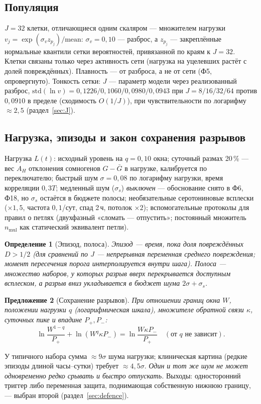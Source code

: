\documentclass[11pt,a4paper]{article}
\newtheorem{proposition}{Предложение}[section]
\newtheorem{definition}[proposition]{Определение}
\theoremstyle{remark}
\begin{document}
\subsection{Популяция}\label{sec:pop}
$J=32$ клетки, отличающиеся одним скаляром --- множителем нагрузки
$v_j=\exp(\sigma_v z_{p_j})/\mathrm{mean}$: $\sigma_v=0{,}10$ --- разброс, а $z_{p_j}$
--- закреплённые нормальные квантили сетки вероятностей, привязанной по краям к
$J=32$. Клетки связаны только через активность сети
(нагрузка на уцелевших растёт с долей повреждённых). Плавность --- от разброса, а не от
сети (Ф5, опровергнуто). Тонкость сетки: $J$ --- параметр модели через реализованный
разброс, $\mathrm{std}(\ln v)=0{,}1226/0{,}1060/0{,}0980/0{,}0943$ при
$J=8/16/32/64$ против $0{,}0910$ в пределе (сходимость $O(1/J)$), при чувствительности
по логарифму $\approx2{,}5$ (раздел~\ref{sec:J}).

\subsection{Нагрузка, эпизоды и закон сохранения разрывов}\label{sec:gap}
Нагрузка $L(t)$: исходный уровень на $q=0{,}10$ окна; суточный размах 20\,\% --- вес
$A_H$ отклонения сомногенов $G-\bar G$ в нагрузке, калибруется по переключателю;
быстрый шум $\sigma=0{,}08$ по логарифму нагрузки,
время корреляции $0{,}3T$; медленный шум ($\sigma_s$) \emph{выключен} --- обоснование
снято в Ф6, Ф18, но $\sigma_s$ остаётся в бюджете полосы; необязательные серотониновые всплески ($\times1{,}5$, частота $0{,}1$/сут, спад
2\,ч, потолок $\times2$); вспомогательные протоколы для правил о петлях (двухфазный
«сломать --- отпустить»; постоянный множитель $n_{\mathrm{mul}}$ как статический
эквивалент петли).

\begin{definition}[Эпизод, полоса]
Эпизод --- время, пока доля повреждённых $D>1/2$ (для сравнений по $J$ --- непрерывная
переменная среднего повреждения; момент пересечения порога интерполируется внутри
шага). \emph{Полоса} --- множество наборов, у которых разрыв вверх перекрывается
доступным всплеском, а разрыв вниз укладывается в бюджет шума $2\sigma+\sigma_s$.
\end{definition}

\begin{proposition}[Сохранение разрывов]\label{prop:gap}
При отношении границ окна $W$, положении нагрузки $q$ (логарифмическая шкала),
множителе обратной связи $\kappa$, суточных пике и впадине $P_+,P_-$:
\begin{equation}\label{eq:gap}
\ln\frac{W^{1-q}}{P_+}+\ln(W^q\kappa P_-)=\ln\frac{W\kappa P_-}{P_+}\quad(\text{от }q\text{ не зависит}).
\end{equation}
\end{proposition}
У типичного набора сумма $\approx9\sigma$ шума нагрузки; клиническая картина (редкие
эпизоды длиной часы--сутки) требует $\approx4{,}5\sigma$. \emph{Один и тот же шум не
может одновременно редко срывать и быстро отпускать.} Выходы: односторонний триггер
либо переменная защита, поднимающая собственную нижнюю границу, --- выбран второй
(раздел~\ref{sec:defence}).
\end{document}
